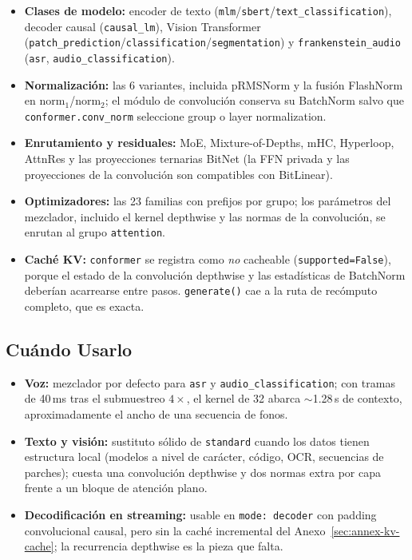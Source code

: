 \begin{itemize}[leftmargin=*]
    \item \textbf{Clases de modelo:} encoder de texto (\texttt{mlm}/\texttt{sbert}/\texttt{text\_classification}), decoder causal (\texttt{causal\_lm}), Vision Transformer (\texttt{patch\_prediction}/\texttt{classification}/\texttt{segmentation}) y \texttt{frankenstein\_audio} (\texttt{asr}, \texttt{audio\_classification}).
    \item \textbf{Normalización:} las 6 variantes, incluida pRMSNorm y la fusión FlashNorm en $\mathrm{norm}_1$/$\mathrm{norm}_2$; el módulo de convolución conserva su BatchNorm salvo que \texttt{conformer.conv\_norm} seleccione group o layer normalization.
    \item \textbf{Enrutamiento y residuales:} MoE, Mixture-of-Depths, mHC, Hyperloop, AttnRes y las proyecciones ternarias BitNet (la FFN privada y las proyecciones de la convolución son compatibles con BitLinear).
    \item \textbf{Optimizadores:} las 23 familias con prefijos por grupo; los parámetros del mezclador, incluido el kernel depthwise y las normas de la convolución, se enrutan al grupo \texttt{attention}.
    \item \textbf{Caché KV:} \texttt{conformer} se registra como \emph{no} cacheable (\texttt{supported=False}), porque el estado de la convolución depthwise y las estadísticas de BatchNorm deberían acarrearse entre pasos. \texttt{generate()} cae a la ruta de recómputo completo, que es exacta.
\end{itemize}

\subsection{Cuándo Usarlo}

\begin{itemize}[leftmargin=*]
    \item \textbf{Voz:} mezclador por defecto para \texttt{asr} y \texttt{audio\_classification}; con tramas de 40\,ms tras el submuestreo $4\times$, el kernel de 32 abarca $\sim$1.28\,s de contexto, aproximadamente el ancho de una secuencia de fonos.
    \item \textbf{Texto y visión:} sustituto sólido de \texttt{standard} cuando los datos tienen estructura local (modelos a nivel de carácter, código, OCR, secuencias de parches); cuesta una convolución depthwise y dos normas extra por capa frente a un bloque de atención plano.
    \item \textbf{Decodificación en streaming:} usable en \texttt{mode: decoder} con padding convolucional causal, pero sin la caché incremental del Anexo~\ref{sec:annex-kv-cache}; la recurrencia depthwise es la pieza que falta.
\end{itemize}
